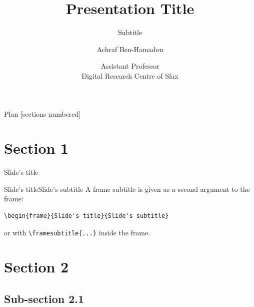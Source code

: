\documentclass[8pt, aspectratio=169]{beamer}
\title{\huge Presentation Title}
\subtitle{Subtitle}
\author{\huge Achraf Ben-Hamadou}
\institute{\normalsize achraf.benhamadou@crns.rnrt.tn}
\date{\normalsize Assistant Professor\\Digital Research Centre of Sfax}
\begin{document}
\maketitle

\begin{frame}{Plan}
  [sections numbered]
  \tableofcontents[hideallsubsections]
\end{frame}

\section{Section 1}
\begin{frame}{Slide's title}

\end{frame}
\begin{frame}[fragile]{Slide's title}{Slide's subtitle}
  A frame subtitle is given as a second argument to the frame:
  \begin{verbatim}\begin{frame}{Slide's title}{Slide's subtitle}\end{verbatim}
  or with \verb|\framesubtitle{...}| inside the frame.
\end{frame}
\section{Section 2}
\subsection{Sub-section 2.1}
\end{document}
